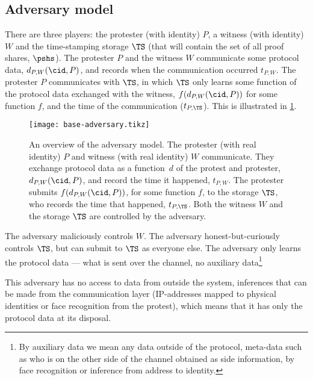 \subsection{Adversary model}%
\label{formal-adversary-model}


There are three players: the protester (with identity) \(P\), a witness (with 
identity) \(W\) and the time-stamping storage \(\TS\) (that will contain the 
set of all proof shares, \(\pshs\)).
The protester \(P\) and the witness \(W\) communicate some protocol data,
\(d_{P,W}(\cid, P)\), and records when the communication occurred \(t_{P,W}\).
The protester \(P\) communicates with \(\TS\), in which \(\TS\) only learns 
some function of the protocol data exchanged with the witness, 
\(f(d_{P,W}(\cid, P))\) for some function \(f\), and the time of the 
communication (\(t_{P,\TS}\)).
This is illustrated in \cref{fig:base-adversary}.

\begin{figure}
  \centering
  \texttt{[image: base-adversary.tikz]}
  \caption{\label{fig:base-adversary}%
    An overview of the adversary model.
    The protester (with real identity) \(P\) and witness (with real identity) 
    \(W\) communicate.
    They exchange protocol data as a function~\(d\) of the protest and 
    protester, \(d_{P,W}(\cid, P)\), and record the time it happened, 
    \(t_{P,W}\).
    The protester submits \(f(d_{P,W}(\cid, P))\), for some function \(f\), to 
    the storage \(\TS\), who records the time that happened, \(t_{P,\TS}\).
    Both the witness \(W\) and the storage \(\TS\) are controlled by the 
    adversary.
  }
\end{figure}

The adversary maliciously controls \(W\).
The adversary honest-but-curiously controls \(\TS\), but can submit to \(\TS\) 
as everyone else.
The adversary only learns the protocol data --- \ie what is sent over the 
channel, no auxiliary data\footnote{%
  By auxiliary data we mean any data outside of the protocol, \ie
  meta-data such as who is on the other side of the channel obtained
  as side information, \eg by face recognition or inference from address
  to identity.
}

This adversary has no access to data from outside the system, \eg inferences 
that can be made from the communication layer (\eg IP-addresses mapped to 
physical identities or face recognition from the protest), which means that it 
has only the protocol data at its disposal.

